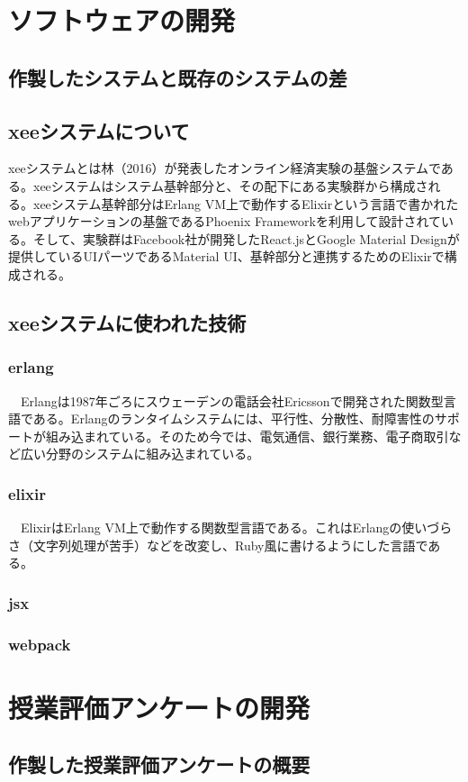 \documentclass[11pt,a4paper]{jsarticle}
\begin{document}
\section{ソフトウェアの開発}
\subsection{作製したシステムと既存のシステムの差}
\subsection{xeeシステムについて}
xeeシステムとは林（2016）が発表したオンライン経済実験の基盤システムである。xeeシステムはシステム基幹部分と、その配下にある実験群から構成される。xeeシステム基幹部分はErlang VM上で動作するElixirという言語で書かれたwebアプリケーションの基盤であるPhoenix Frameworkを利用して設計されている。そして、実験群はFacebook社が開発したReact.jsとGoogle Material Designが提供しているUIパーツであるMaterial UI、基幹部分と連携するためのElixirで構成される。
\subsection{xeeシステムに使われた技術}
\subsubsection{erlang}
　Erlangは1987年ごろにスウェーデンの電話会社Ericssonで開発された関数型言語である。Erlangのランタイムシステムには、平行性、分散性、耐障害性のサポートが組み込まれている。そのため今では、電気通信、銀行業務、電子商取引など広い分野のシステムに組み込まれている。
\subsubsection{elixir}
　ElixirはErlang VM上で動作する関数型言語である。これはErlangの使いづらさ（文字列処理が苦手）などを改変し、Ruby風に書けるようにした言語である。
\subsubsection{jsx}
\subsubsection{webpack}
\section{授業評価アンケートの開発}
\subsection{作製した授業評価アンケートの概要}
\end{document}
